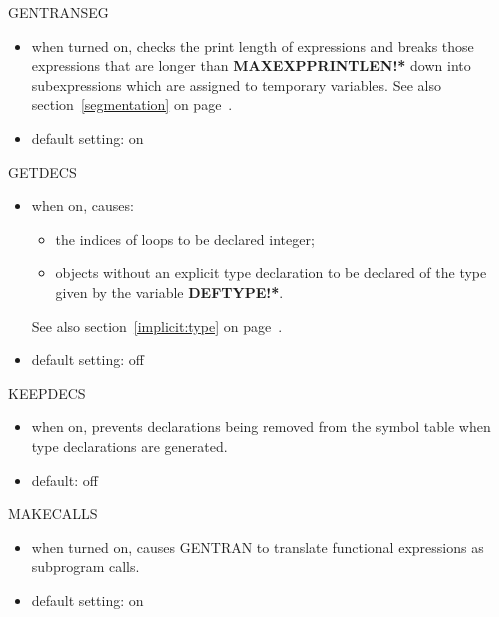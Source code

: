 \begin{describe}{GENTRANSEG} 
\begin{itemize}
\item when turned on, checks the print length of expressions and breaks
those expressions that are longer than {\bf MAXEXPPRINTLEN!*} down
into subexpressions which are assigned to temporary variables.
See also section~\ref{segmentation} on page~\pageref{segmentation}.
\item default setting:  on
\end{itemize}
\end{describe}

\begin{describe}{GETDECS}
\begin{itemize}
\item when on, causes:
\begin{itemize}
\item the indices of loops to be declared integer;
\item objects without an explicit type declaration to be declared of the type
given by the variable {\bf DEFTYPE!*}. 
\end{itemize}
See also section~\ref{implicit:type} on page~\pageref{implicit:type}.
\item default setting:  off
\end{itemize}
\end{describe}

\begin{describe}{KEEPDECS}
\begin{itemize}
\item when on, prevents declarations being removed from the symbol table when
type declarations are generated.
\item default: off
\end{itemize}
\end{describe}

\begin{describe}{MAKECALLS}
\begin{itemize}
\item when turned on, causes GENTRAN to translate functional expressions as
subprogram calls.
\item default setting: on
\end{itemize}
\end{describe}

